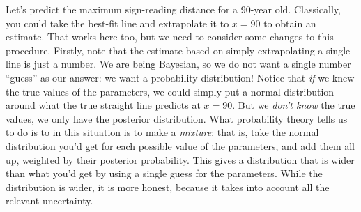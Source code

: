 Let's predict the maximum sign-reading distance for a 90-year old. Classically,
you could take the best-fit line and extrapolate it to $x=90$ to obtain an
estimate. That works here too, but we need to consider some changes to this
procedure. Firstly, note that the estimate based on simply extrapolating a
single line is just a number. We are being Bayesian, so we do not want a single
number ``guess'' as our answer: we want a probability distribution! Notice that
{\it if} we knew the true values of the parameters, we could simply put a normal
distribution around what the true straight line predicts at $x=90$. But we
{\it don't know} the true values, we only have the posterior distribution. What
probability theory tells us to do is to in this situation is to make a {\it
mixture}: that is, take the normal distribution you'd get for each possible
value of the parameters, and add them all up, weighted by their posterior
probability. This gives a distribution that is wider than what you'd get by
using a single guess for the parameters. While the distribution is wider, it
is more honest, because it takes into account all the relevant uncertainty.

